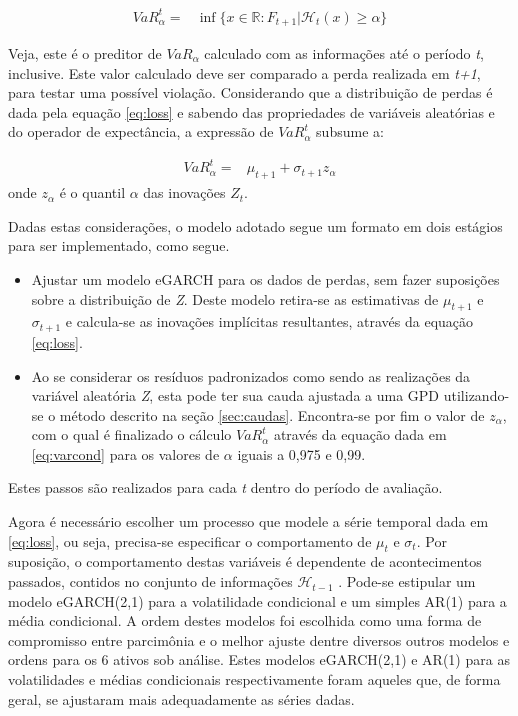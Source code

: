 \documentclass[review]{elsarticle}
\theoremstyle{definition}
\begin{document}
\begin{align}
VaR_\alpha^t=&\inf\{x \in \mathbb{R}: F_{t+1} | \mathcal{H}_t(x) \geq \alpha\}
\end{align}

Veja, este é o preditor de $VaR_\alpha$ calculado com as informações até o período \emph{t}, inclusive. Este valor calculado deve ser comparado a perda realizada em \emph{t+1}, para testar uma possível violação.
Considerando que a distribuição de perdas é dada pela equação \eqref{eq:loss} e sabendo das propriedades de variáveis aleatórias e do operador de expectância, a expressão de $VaR_\alpha^t$ subsume a:

\begin{align}
\label{eq:varcond} 
VaR_\alpha^t=&\mu_{t+1}+\sigma_{t+1}z_\alpha 
\end{align}
onde $z_\alpha$ é o quantil $\alpha$ das inovações $Z_t$.

Dadas estas considerações, o modelo adotado segue um formato em dois estágios para ser implementado, como segue.
\begin{itemize}
	\item Ajustar um modelo eGARCH para os dados de perdas, sem fazer suposições sobre a distribuição de \emph{Z}. Deste modelo retira-se as estimativas de $\mu_{t+1}$ e $\sigma_{t+1}$ e calcula-se as inovações implícitas resultantes, através da equação \eqref{eq:loss}.
	\item Ao se considerar os resíduos padronizados como sendo as realizações da variável aleatória \emph{Z}, esta pode ter sua cauda ajustada a uma GPD utilizando-se o método descrito na seção \ref{sec:caudas}. Encontra-se por fim o valor de $z_\alpha$, com o qual é finalizado o cálculo $VaR_\alpha^t$ através da equação dada em \eqref{eq:varcond} para os valores de $\alpha$ iguais a 0,975 e 0,99.
\end{itemize}

Estes passos são realizados para cada \emph{t} dentro do período de avaliação.

Agora é necessário escolher um processo que modele a série temporal dada em \eqref{eq:loss}, ou seja, precisa-se especificar o comportamento de $\mu_t$ e $\sigma_t$. Por suposição, o comportamento destas variáveis é dependente de acontecimentos passados, contidos no conjunto de informações $\mathcal{H}_{t-1}$ . Pode-se estipular um modelo eGARCH(2,1) para a volatilidade condicional e um simples AR(1) para a média condicional. A ordem destes modelos foi escolhida como uma forma de compromisso entre parcimônia e o melhor ajuste dentre diversos outros modelos e ordens para os 6 ativos sob análise. Estes modelos eGARCH(2,1) e AR(1) para as volatilidades e médias condicionais respectivamente foram aqueles que, de forma geral, se ajustaram mais adequadamente as séries dadas.
\end{document}
